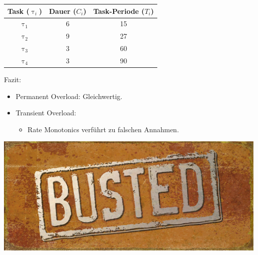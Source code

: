\newcommand{\showRMSlideRob}[1] {\begin{frame}{\subsubsecname}
	\begin{center}
		\begin{tabular}{c||c|c}
			Task ($\uptau_i$) & Dauer ($C_i$) & Task-Periode ($T_i$)\\\hline\hline
			$\uptau_1$ & 6 & 15\\
			$\uptau_2$ & 9 & 27\\
			$\uptau_3$ & 3 & 60\\
			$\uptau_4$ & 3 & 90
		\end{tabular}
	\end{center}
	
\end{frame}}

%
{%
	\showRMSlideRob{\arabic{ct}}
}

\begin{frame}{\subsecname}
	Fazit:
	\begin{itemize}
		\item Permanent Overload: Gleichwertig.
		\item Transient Overload:
		\begin{itemize}
			\item Rate Monotonics verführt zu falschen Annahmen.
		\end{itemize}
	\end{itemize}
\end{frame}

\begin{frame}{\subsecname}
	\begin{center}
			\includegraphics[scale=1]{graphics/memes/busted.jpg}
	\end{center}
\end{frame}
